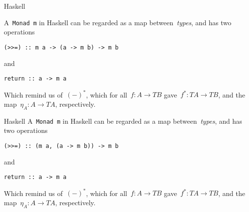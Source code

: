 \documentclass[notes]{beamer}
\begin{document}
\begin{frame}[fragile]{Haskell}

    A~\texttt{Monad m} in Haskell can be regarded as a map
    between~\emph{types}, and has two operations
    \begin{verbatim}
(>>=) :: m a -> (a -> m b) -> m b
    \end{verbatim}
    and
    \begin{verbatim}
return :: a -> m a
    \end{verbatim}


    \pause

    Which remind us of~\((-)^{\ast}\), which for all~\(f:A\longrightarrow TB\)
    gave~\(f^{\ast}:TA\longrightarrow TB\), and the
    map~\(\eta_{A}:A\longrightarrow TA\), respectively.

\end{frame}

\begin{frame}[fragile]{Haskell}
    A~\texttt{Monad m} in Haskell can be regarded as a map
    between~\emph{types}, and has two operations
    \begin{verbatim}
(>>=) :: (m a, (a -> m b)) -> m b
    \end{verbatim}
    and
    \begin{verbatim}
return :: a -> m a
    \end{verbatim}

    Which remind us of~\((-)^{\ast}\), which for all~\(f:A\longrightarrow TB\)
    gave~\(f^{\ast}:TA\longrightarrow TB\), and the
    map~\(\eta_{A}:A\longrightarrow TA\), respectively.
\end{frame}
\end{document}
